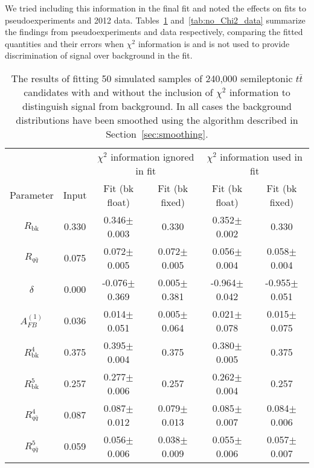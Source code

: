 \documentclass{cmspaperpdf}
\begin{document}
We tried including this information in the final fit and noted the effects on fits to pseudoexperiments and 2012 data. Tables~\ref{tab:no_Chi2_pseudoexperiments} and~\ref{tab:no_Chi2_data} summarize the findings from pseudoexperiments and data respectively, comparing the fitted quantities and their errors when $\chi^{2}$ information is and is not used to provide discrimination of signal over background in the fit.

\begin{table}[hbt]
\begin{center}
\caption{\small \label{tab:no_Chi2_pseudoexperiments} The results of fitting 50 simulated samples of 240,000 semileptonic $t\bar t$ candidates with and without the inclusion of $\chi^{2}$ information to distinguish signal from background. In all cases the background distributions have been smoothed using the algorithm described in Section~\ref{sec:smoothing}.}
\vspace{3pt}
\begin{tabular}{|c|c|cc|cc|}\hline
                  &       &\multicolumn{2}{|c|}{$\chi^{2}$ information ignored in fit} & \multicolumn{2}{c|}{$\chi^{2}$ information used in fit} \\
Parameter         & Input & Fit (bk float)   & Fit (bk fixed)                      & Fit (bk float)   & Fit (bk fixed)   \\ 
\hline
$R_\mathrm{bk}$   & 0.330 & 0.346$\pm$0.003  & 0.330                               & 0.352$\pm$0.002  & 0.330            \\ 
$R_{q\bar q}$     & 0.075 & 0.072$\pm$0.005  & 0.072$\pm$0.005                     & 0.056$\pm$0.004  & 0.058$\pm$0.004  \\ 
$\delta$          & 0.000 & -0.076$\pm$0.369 & 0.005$\pm$0.381                     & -0.964$\pm$0.042 & -0.955$\pm$0.051 \\ 
$A^{(1)}_{FB}$    & 0.036 & 0.014$\pm$0.051  & 0.005$\pm$0.064                     & 0.021$\pm$0.078  & 0.015$\pm$0.075  \\ 
\hline
$R^4_\mathrm{bk}$ & 0.375 & 0.395$\pm$0.004  & 0.375                               & 0.380$\pm$0.005  & 0.375            \\ 
$R^5_\mathrm{bk}$ & 0.257 & 0.277$\pm$0.006  & 0.257                               & 0.262$\pm$0.004  & 0.257            \\ 
$R^4_{q\bar q}$   & 0.087 & 0.087$\pm$0.012  & 0.079$\pm$0.013                     & 0.085$\pm$0.007  & 0.084$\pm$0.006  \\ 
$R^5_{q\bar q}$   & 0.059 & 0.056$\pm$0.006  & 0.038$\pm$0.009                     & 0.055$\pm$0.006  & 0.057$\pm$0.007  \\ 

\end{tabular}
\end{center}
\end{table}
\end{document}
